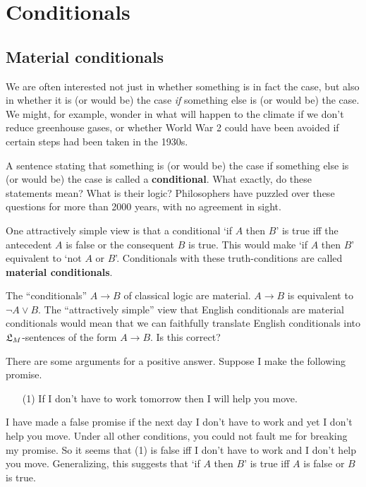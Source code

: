 \chapter{Conditionals}\label{ch:conditionals}

\section{Material conditionals}\label{sec:material}

We are often interested not just in whether something is in fact the case, but
also in whether it is (or would be) the case \emph{if} something else is (or
would be) the case. We might, for example, wonder in what will happen to the
climate if we don't reduce greenhouse gases, or whether World War 2 could have
been avoided if certain steps had been taken in the 1930s.

A sentence stating that something is (or would be) the case if something else is
(or would be) the case is called a \textbf{conditional}. What exactly, do these
statements mean? What is their logic? Philosophers have puzzled over these
questions for more than 2000 years, with no agreement in sight.

One attractively simple view is that a conditional `if $A$ then $B$' is true iff
the antecedent $A$ is false or the consequent $B$ is true. This would make `if
$A$ then $B$' equivalent to `not $A$ or $B$'. Conditionals with these
truth-conditions are called \textbf{material conditionals}.

The ``conditionals'' $A \to B$ of classical logic are material. $A \to B$ is
equivalent to $\neg A \lor B$. The ``attractively simple'' view that English
conditionals are material conditionals would mean that we can faithfully
translate English conditionals into $\mathfrak{L}_{M}$-sentences of the form $A \to B$. Is
this correct?

There are some arguments for a positive answer. Suppose I make the following
promise.
\begin{itemize}[leftmargin=10mm]
  \item[(1)] If I don't have to work tomorrow then I will help you move.
\end{itemize}
I have made a false promise if the next day I don't have to work and yet I don't
help you move. Under all other conditions, you could not fault me for breaking my
promise. So it seems that (1) is false iff I don't have to work and I don't help
you move. Generalizing, this suggests that `if $A$ then $B$' is true iff $A$ is
false or $B$ is true.

